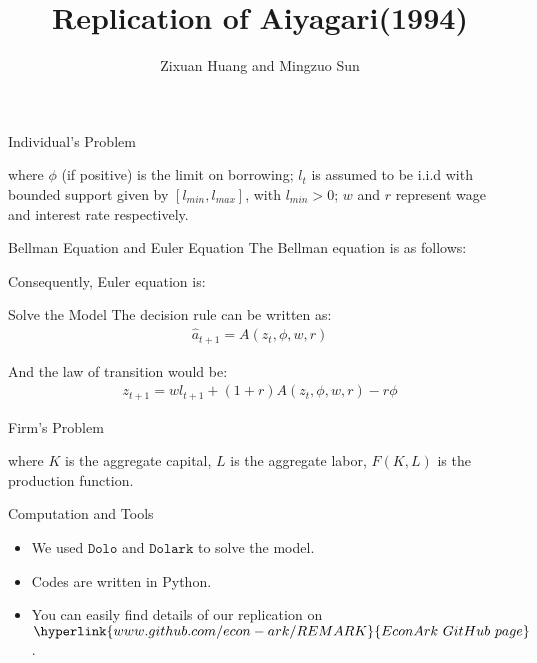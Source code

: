 \documentclass{beamer}
\title{Replication of Aiyagari(1994)}
\author{Zixuan Huang and Mingzuo Sun}
\providecommand{\EqDir}{../Equations}
\begin{document}
\begin{frame}[plain]
    \maketitle
    
    
\end{frame}

\begin{frame}{Individual's Problem}
	
	
	where $\phi$ (if positive) is the limit on borrowing; $l_t$ is assumed to be i.i.d with bounded support given by $[l_{min},l_{max}]$, with $l_{min}>0$; $w$ and $r$ represent wage and interest rate respectively.
	
\end{frame}

\begin{frame}{Bellman Equation and Euler Equation}
	The Bellman equation is as follows:
	
	
	Consequently, Euler equation is: 
	
\end{frame}

\begin{frame}{Solve the Model}
	The decision rule can be written as: 
	\begin{align}
	\hat{a}_{t+1}=A(z_t,\phi,w,r)
	\end{align}
	
	And the law of transition would be:
	\begin{align}
	z_{t+1}=wl_{t+1}+(1+r)A(z_t,\phi,w,r)-r\phi
	\end{align}
	
\end{frame}

\begin{frame}{Firm's Problem}
	
	where $K$ is the aggregate capital, $L$ is the aggregate labor, $F(K,L)$ is the production function.
\end{frame}

\begin{frame}{Computation and Tools}
	\begin{itemize}
		\item We used $\texttt{Dolo}$ and $\texttt{Dolark}$ to solve the model.
		\item Codes are written in Python. 
		\item You can easily find details of our replication on $\hyperlink{www.github.com/econ-ark/REMARK}{EconArk\ GitHub \ page}$.
	\end{itemize}
	
	
\end{frame}
\end{document}
